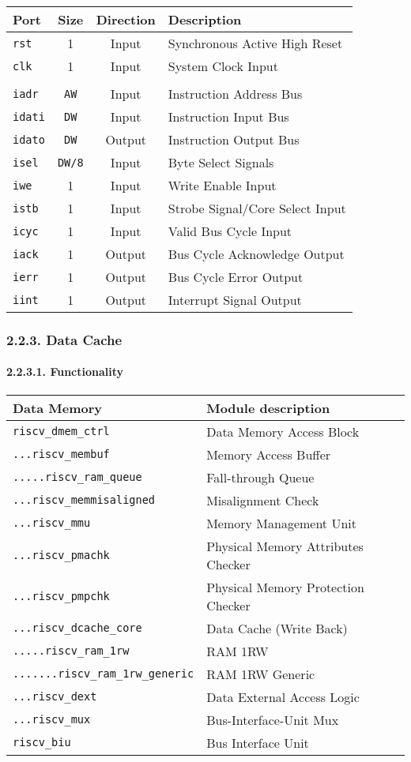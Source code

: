 \documentclass[]{article}
\let\oldparagraph\paragraph
\renewcommand{\paragraph}[1]{\oldparagraph{#1}\mbox{}}
\begin{document}
\begin{longtable}[]{@{}lccl@{}}
\toprule
Port & Size & Direction & Description\tabularnewline
\midrule
\endhead
\texttt{rst} & 1 & Input & Synchronous Active High Reset\tabularnewline
\texttt{clk} & 1 & Input & System Clock Input\tabularnewline
& & &\tabularnewline
\texttt{iadr} & \texttt{AW} & Input & Instruction Address
Bus\tabularnewline
\texttt{idati} & \texttt{DW} & Input & Instruction Input
Bus\tabularnewline
\texttt{idato} & \texttt{DW} & Output & Instruction Output
Bus\tabularnewline
\texttt{isel} & \texttt{DW/8} & Input & Byte Select
Signals\tabularnewline
\texttt{iwe} & 1 & Input & Write Enable Input\tabularnewline
\texttt{istb} & 1 & Input & Strobe Signal/Core Select
Input\tabularnewline
\texttt{icyc} & 1 & Input & Valid Bus Cycle Input\tabularnewline
\texttt{iack} & 1 & Output & Bus Cycle Acknowledge Output\tabularnewline
\texttt{ierr} & 1 & Output & Bus Cycle Error Output\tabularnewline
\texttt{iint} & 1 & Output & Interrupt Signal Output\tabularnewline
\bottomrule
\end{longtable}

\subsubsection{2.2.3. Data Cache}\label{data-cache}

\paragraph{2.2.3.1. Functionality}\label{functionality-2}

\begin{longtable}[]{@{}ll@{}}
\toprule
Data Memory & Module description\tabularnewline
\midrule
\endhead
\texttt{riscv\_dmem\_ctrl} & Data Memory Access Block\tabularnewline
\texttt{...riscv\_membuf} & Memory Access Buffer\tabularnewline
\texttt{.....riscv\_ram\_queue} & Fall-through Queue\tabularnewline
\texttt{...riscv\_memmisaligned} & Misalignment Check\tabularnewline
\texttt{...riscv\_mmu} & Memory Management Unit\tabularnewline
\texttt{...riscv\_pmachk} & Physical Memory Attributes
Checker\tabularnewline
\texttt{...riscv\_pmpchk} & Physical Memory Protection
Checker\tabularnewline
\texttt{...riscv\_dcache\_core} & Data Cache (Write Back)\tabularnewline
\texttt{.....riscv\_ram\_1rw} & RAM 1RW\tabularnewline
\texttt{.......riscv\_ram\_1rw\_generic} & RAM 1RW
Generic\tabularnewline
\texttt{...riscv\_dext} & Data External Access Logic\tabularnewline
\texttt{...riscv\_mux} & Bus-Interface-Unit Mux\tabularnewline
\texttt{riscv\_biu} & Bus Interface Unit\tabularnewline
\bottomrule
\end{longtable}
\end{document}
